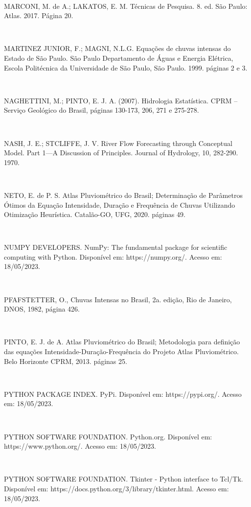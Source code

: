 \begin{flushleft}
\

MARCONI, M. de A.; LAKATOS, E. M. Técnicas de Pesquisa. 8. ed. São Paulo: Atlas. 2017. Página 20.

\

MARTINEZ JUNIOR, F.; MAGNI, N.L.G. Equações de chuvas intensas do Estado de São Paulo. São Paulo Departamento de Águas e Energia Elétrica, Escola Politécnica da Universidade de São Paulo, São Paulo. 1999. páginas 2 e 3.

\

NAGHETTINI, M.; PINTO, E. J. A. (2007). Hidrologia Estatística. CPRM – Serviço Geológico do Brasil, páginas 130-173, 206, 271 e 275-278.

\

NASH, J. E.; STCLIFFE, J. V. River Flow Forecasting through Conceptual Model. Part 1—A Discussion of Principles. Journal of Hydrology, 10, 282-290. 1970.

\

NETO, E. de P. S. Atlas Pluviométrico do Brasil; Determinação de Parâmetros Ótimos da Equação Intensidade, Duração e Frequência de Chuvas Utilizando Otimização Heurística. Catalão-GO, UFG, 2020. páginas 49.

\

NUMPY DEVELOPERS. NumPy: The fundamental package for scientific computing with Python. Disponível em: https://numpy.org/. Acesso em: 18/05/2023.

\

PFAFSTETTER, O., Chuvas Intensas no Brasil, 2a. edição, Rio de Janeiro, DNOS, 1982, página 426.

\

PINTO, E. J. de A. Atlas Pluviométrico do Brasil; Metodologia para definição das equações Intensidade-Duração-Frequência do Projeto Atlas Pluviométrico. Belo Horizonte CPRM, 2013. páginas 25.

\

\newpage

PYTHON PACKAGE INDEX. PyPi. Disponível em: https://pypi.org/. Acesso em: 18/05/2023.

\

PYTHON SOFTWARE FOUNDATION. Python.org. Disponível em: https://www.python.org/. Acesso em: 18/05/2023.

\

PYTHON SOFTWARE FOUNDATION. Tkinter - Python interface to Tcl/Tk. Disponível em: https://docs.python.org/3/library/tkinter.html. Acesso em: 18/05/2023.

\


\end{flushleft}
